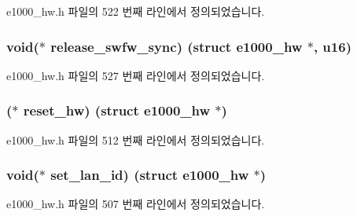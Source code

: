 e1000\+\_\+hw.\+h 파일의 522 번째 라인에서 정의되었습니다.

\subsubsection[{\texorpdfstring{release\+\_\+swfw\+\_\+sync}{release_swfw_sync}}]{\setlength{\rightskip}{0pt plus 5cm}void($\ast$ release\+\_\+swfw\+\_\+sync) (struct {\bf e1000\+\_\+hw} $\ast$, {\bf u16})}\hypertarget{structe1000__mac__operations_a0aa9b26ec01a96e7f41f49e00f527ae3}{}\label{structe1000__mac__operations_a0aa9b26ec01a96e7f41f49e00f527ae3}


e1000\+\_\+hw.\+h 파일의 527 번째 라인에서 정의되었습니다.

\subsubsection[{\texorpdfstring{reset\+\_\+hw}{reset_hw}}]{($\ast$ reset\+\_\+hw) (struct {\bf e1000\+\_\+hw} $\ast$)}\hypertarget{structe1000__mac__operations_ab1bc8ebd08e9e205a337150d76b68a18}{}\label{structe1000__mac__operations_ab1bc8ebd08e9e205a337150d76b68a18}


e1000\+\_\+hw.\+h 파일의 512 번째 라인에서 정의되었습니다.

\subsubsection[{\texorpdfstring{set\+\_\+lan\+\_\+id}{set_lan_id}}]{\setlength{\rightskip}{0pt plus 5cm}void($\ast$ set\+\_\+lan\+\_\+id) (struct {\bf e1000\+\_\+hw} $\ast$)}\hypertarget{structe1000__mac__operations_aa4701bf39adeb17df4723d7c8873eb51}{}\label{structe1000__mac__operations_aa4701bf39adeb17df4723d7c8873eb51}


e1000\+\_\+hw.\+h 파일의 507 번째 라인에서 정의되었습니다.

